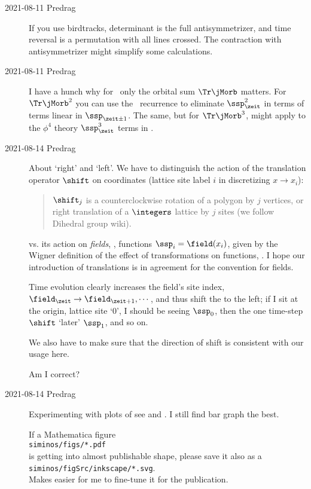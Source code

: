 \begin{description}
\item[2021-08-11 Predrag]
If you use birdtracks, determinant is the full antisymmetrizer, and time
reversal is a permutation with all lines crossed. The contraction with
antisymmetrizer might simplify some calculations.

\item[2021-08-11 Predrag]
I have a hunch why for \Henon\ only the orbital sum $\Tr\jMorb$ matters.
For $\Tr\jMorb^2$ you can use the \henlatt\ recurrence 
to eliminate $\ssp_{\zeit}^2$ in terms of terms linear in
$\ssp_{\zeit\pm1}$. The same, but for $\Tr\jMorb^3$, might apply to the
{$\phi^4$} theory $\ssp_{\zeit}^3$ terms in .

\item[2021-08-14 Predrag]
About `right' and `left'. We have to distinguish the action of the
translation operator $\shift$ on coordinates (lattice site label $i$ in
discretizing $x\to{x_i}$):
\begin{quote}
$\shift_j$
is a counterclockwise rotation of a polygon by $j$ vertices, or right
 translation of a $\integers$ lattice by $j$ sites (we follow
    {Dihedral group wiki}).
\end{quote}
vs. its action on {\em fields}, \ie, functions $\ssp_i=\field(x_i)$,
given by the Wigner definition of the effect of
transformations on functions, . I
hope our introduction of translations  is in agreement
for the convention for fields.

Time evolution clearly increases the field's site index,
$\field_\zeit\to\field_{\zeit+1}, \cdots$, and thus shift the {\lattstate}
to the left; if I sit at the origin, lattice site `0', I should be seeing
$\ssp_0$, then the one time-step $\shift$ `later' $\ssp_1$, and so on.

We also have to make sure that the direction of shift
 is consistent with our usage
here.

Am I correct?

\item[2021-08-14 Predrag]
Experimenting with {\lattstate} plots of  see
 and . I still find
bar graph  the best.

If a
Mathematica figure\\
\texttt{siminos/figs/*.pdf}\\
is getting into almost publishable shape, please save it also as a\\
\texttt{siminos/figSrc/inkscape/*.svg}.\\
Makes easier for me to fine-tune it for the publication.


\end{description}
